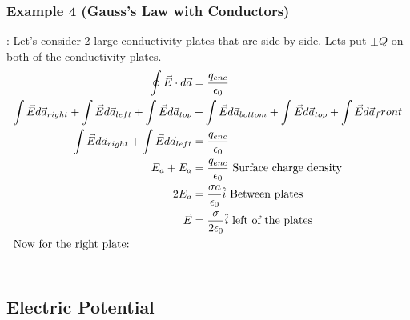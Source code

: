   \subsubsection{Example 4 (Gauss's Law with Conductors)}:
  Let's consider 2 large conductivity plates that are side by side. Lets put $\pm Q$ on both of the conductivity plates.
  \begin{align*}
    \oint\vec{E}\cdot d\vec{a}&=\frac{q_{enc}}{\epsilon_0}\\
    \int\vec{E}d\vec{a}_{right}+\int\vec{E}d\vec{a}_{left}+\int\vec{E}d\vec{a}_{top}&+\int\vec{E}d\vec{a}_{bottom}+\int\vec{E}d\vec{a}_{top}+\int\vec{E}d\vec{a}_front\\
    \int\vec{E}d\vec{a}_{right}+\int\vec{E}d\vec{a}_{left}&=\frac{q_{enc}}{\epsilon_0}\\
    E_a+E_a&=\frac{q_{enc}}{\epsilon_0} \text{ Surface charge density}\\
    2E_a&=\frac{\sigma a}{\epsilon_0}\hat{i} \text{ Between plates}\\
    \vec{E}&=\frac{\sigma}{2\epsilon_0}\hat{i} \text{ left of the plates}\\
    \shortintertext{Now for the right plate:}\\
  \end{align*}



  \newpage
  \subsection{Electric Potential}
